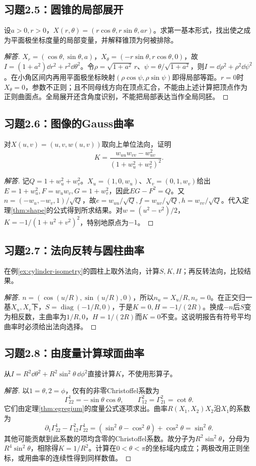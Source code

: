 \subsection*{习题2.5：圆锥的局部展开}
设$a>0,r>0$，$X(r,\theta)=(r\cos\theta,r\sin\theta,ar)$。求第一基本形式，找出使之成为平面极坐标度量的局部变量，并解释锥顶为何被排除。
\begin{proof}[解答]
$X_r=(\cos\theta,\sin\theta,a)$，$X_\theta=(-r\sin\theta,r\cos\theta,0)$，故$I=(1+a^2)\dd r^2+r^2\dd\theta^2$。令$\rho=\sqrt{1+a^2}\,r$、$\psi=\theta/\sqrt{1+a^2}$，则$I=\dd\rho^2+\rho^2\dd\psi^2$。在小角区间内再用平面极坐标映射$(\rho\cos\psi,\rho\sin\psi)$即得局部等距。$r=0$时$X_\theta=0$，参数不正则；且不同母线方向在顶点汇合，不能由上述计算把顶点作为正则曲面点。全局展开还含角度识别，不能把局部表达当作全局同胚。
\end{proof}
\subsection*{习题2.6：图像的Gauss曲率}
对$X(u,v)=(u,v,w(u,v))$取向上单位法向，证明
\[
 K=\frac{w_{uu}w_{vv}-w_{uv}^2}{(1+w_u^2+w_v^2)^2}.
\]
\begin{proof}[解答]
记$Q=1+w_u^2+w_v^2$。$X_u=(1,0,w_u)$、$X_v=(0,1,w_v)$给出$E=1+w_u^2,F=w_uw_v,G=1+w_v^2$，因此$EG-F^2=Q$。又$n=(-w_u,-w_v,1)/\sqrt Q$，故$e=w_{uu}/\sqrt Q,f=w_{uv}/\sqrt Q,h=w_{vv}/\sqrt Q$。代入定理\ref{thm:shape}的公式得到所求结果。对$w=(u^2-v^2)/2$，$K=-1/(1+u^2+v^2)^2$，特别地原点为$-1$。
\end{proof}
\subsection*{习题2.7：法向反转与圆柱曲率}
在例\ref{ex:cylinder-isometry}的圆柱上取外法向，计算$S,K,H$；再反转法向，比较结果。
\begin{proof}[解答]
$n=(\cos(u/R),\sin(u/R),0)$，所以$n_u=X_u/R,n_v=0$。在正交归一基$X_u,X_v$下，$S=\operatorname{diag}(-1/R,0)$，于是$K=0,H=-1/(2R)$。换成$-n$后$S$变为相反数，主曲率为$1/R,0$，$H=1/(2R)$而$K=0$不变。这说明报告有符号平均曲率时必须给出法向选择。
\end{proof}
\subsection*{习题2.8：由度量计算球面曲率}
从$I=R^2\dd\theta^2+R^2\sin^2\theta\,\dd\phi^2$直接计算$K$，不使用形算子。
\begin{proof}[解答]
以$1=\theta,2=\phi$，仅有的非零Christoffel系数为
\[
 \Gamma^1_{22}=-\sin\theta\cos\theta,\qquad
 \Gamma^2_{12}=\Gamma^2_{21}=\cot\theta.
\]
它们由定理\ref{thm:egregium}的度量公式逐项求出。曲率$R(X_1,X_2)X_2$沿$X_1$的系数为
\[
 \partial_1\Gamma^1_{22}-\Gamma^2_{12}\Gamma^1_{22}
 =(\sin^2\theta-\cos^2\theta)+\cos^2\theta=\sin^2\theta.
\]
其他可能贡献到此系数的项均含零的Christoffel系数。故分子为$R^2\sin^2\theta$，分母为$R^4\sin^2\theta$，相除得$K=1/R^2$。计算在$0<\theta<\pi$的坐标域内成立；两极改用正则坐标，或用曲率的连续性得到同样数值。
\end{proof}
